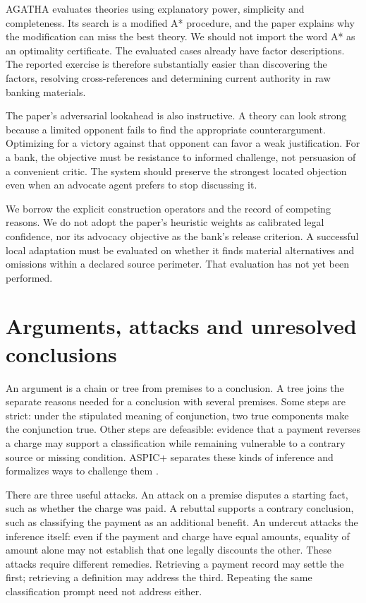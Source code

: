 
AGATHA evaluates theories using explanatory power, simplicity and completeness.
Its search is a modified A* procedure, and the paper explains why the modification
can miss the best theory. We should not import the word A* as an optimality
certificate. The evaluated cases already have factor descriptions. The reported
exercise is therefore substantially easier than discovering the factors,
resolving cross-references and determining current authority in raw banking
materials.

The paper's adversarial lookahead is also instructive. A theory can look strong
because a limited opponent fails to find the appropriate counterargument.
Optimizing for a victory against that opponent can favor a weak justification.
For a bank, the objective must be resistance to informed challenge, not persuasion
of a convenient critic. The system should preserve the strongest located
objection even when an advocate agent prefers to stop discussing it.

We borrow the explicit construction operators and the record of competing
reasons. We do not adopt the paper's heuristic weights as calibrated legal
confidence, nor its advocacy objective as the bank's release criterion. A
successful local adaptation must be evaluated on whether it finds material
alternatives and omissions within a declared source perimeter. That evaluation
has not yet been performed.

\section{Arguments, attacks and unresolved conclusions}
\label{merge:M05:04}


An argument is a chain or tree from premises to a conclusion. A tree joins
the separate reasons needed for a conclusion with several premises. Some steps are strict:
under the stipulated meaning of conjunction, two true components make the
conjunction true. Other steps are defeasible: evidence that a payment reverses a
charge may support a classification while remaining vulnerable to a contrary
source or missing condition. ASPIC+ separates these kinds of inference and
formalizes ways to challenge them \citep[sections 2--3]{aspic2010}.

There are three useful attacks. An attack on a premise disputes a starting fact,
such as whether the charge was paid. A rebuttal supports a contrary conclusion,
such as classifying the payment as an additional benefit. An undercut attacks the
inference itself: even if the payment and charge have equal amounts, equality of
amount alone may not establish that one legally discounts the other. These
attacks require different remedies. Retrieving a payment record may settle the
first; retrieving a definition may address the third. Repeating the same
classification prompt need not address either.

